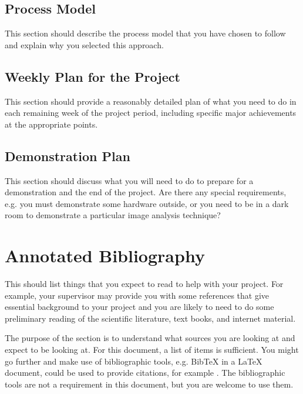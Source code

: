 \documentclass[11pt,fleqn,twoside]{article}
\begin{document}
\subsection{Process Model}
This section should describe the process model that you have chosen to follow and explain why you selected this approach.

\subsection{Weekly Plan for the Project}
This section should provide a reasonably detailed plan of what you need to do in each remaining week of the project period, including specific major achievements at the appropriate points.

\subsection{Demonstration Plan}
This section should discuss what you will need to do to prepare for a demonstration and the end of the project. Are there any special requirements, e.g. you must demonstrate some hardware outside, or you need to be in a dark room to demonstrate a particular image analysis technique?

\section*{Annotated Bibliography}

This should list things that you expect to read to help with your project. For example, your supervisor may provide you with some references that give essential background to your project and you are likely to need to do some preliminary reading of the scientific literature, text books, and internet material.

The purpose of the section is to understand what sources you are looking at and expect to be looking at.  For this document, a list of items is sufficient. You might go further and make use of bibliographic tools, e.g. BibTeX in a LaTeX document, could be used to provide citations, for example \cite{NumericalRecipes}\cite{MarksPaper}\cite{FailBlog}\cite{kittenpic_ref}.  The bibliographic tools are not a requirement in this document, but you are welcome to use them.  


\renewcommand{\refname}{}  %
\end{document}

